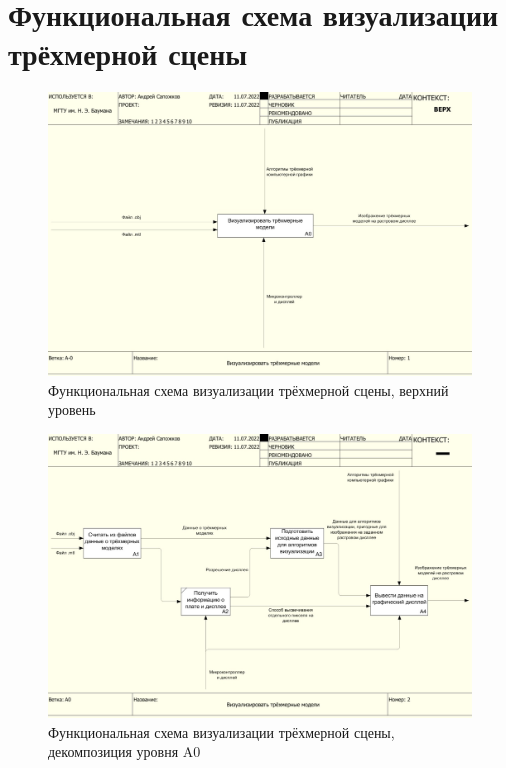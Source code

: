 \chapter{Функциональная схема визуализации трёхмерной сцены}
\label{cha:appendix1}

\begin{figure}[h]
	\centering
	\includegraphics[width=\textwidth ]{img/IDEF0/A0.jpg}
	\caption{Функциональная схема визуализации трёхмерной сцены, верхний уровень}
\end{figure} 

\begin{figure}[h]
	\centering
	\includegraphics[width=\textwidth ]{img/IDEF0/A0_decomposition.jpg}
	\caption{Функциональная схема визуализации трёхмерной сцены, декомпозиция уровня A0}
\end{figure} 

